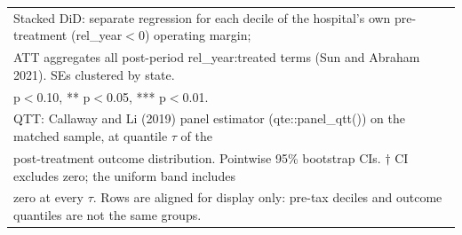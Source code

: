 \begin{table}[!h]
\begin{tabular}[t]{lcrcrc}
\multicolumn{6}{l}{\footnotesize Stacked DiD: separate regression for each decile of the hospital's own pre-treatment (rel\_year$<$0) operating margin;}\\
\multicolumn{6}{l}{\footnotesize ATT aggregates all post-period rel\_year:treated terms (Sun and Abraham 2021). SEs clustered by state.}\\
\multicolumn{6}{l}{\footnotesize * p$<$0.10, ** p$<$0.05, *** p$<$0.01.}\\
\multicolumn{6}{l}{\footnotesize QTT: Callaway and Li (2019) panel estimator (qte::panel\_qtt()) on the matched sample, at quantile $\tau$ of the}\\
\multicolumn{6}{l}{\footnotesize post-treatment outcome distribution. Pointwise 95\% bootstrap CIs. $\dagger$ CI excludes zero; the uniform band includes}\\
\multicolumn{6}{l}{\footnotesize zero at every $\tau$. Rows are aligned for display only: pre-tax deciles and outcome quantiles are not the same groups.}\\
\end{tabular}
\end{table}
